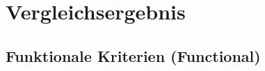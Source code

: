 
\section{Vergleichsergebnis}\label{sec:comparisonResults}

\subsection{Funktionale Kriterien (Functional)}

